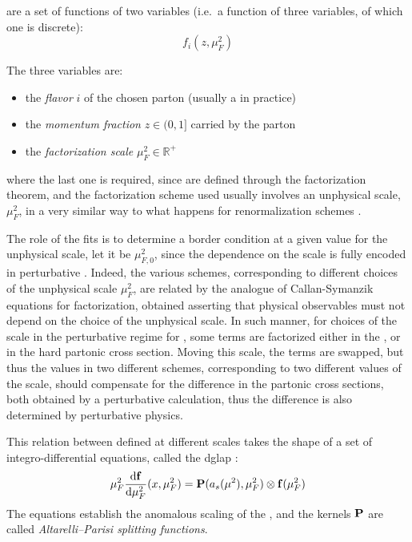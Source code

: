 
\pdfs are a set of functions of two variables (i.e.\ a function of three
variables, of which one is discrete):
\begin{equation}
  f_i(z, \mu_F^2)
  \label{eq:qcd/pdfs}
\end{equation}

The three variables are:
\begin{itemize}
  \item the \textit{flavor} $i$ of the chosen parton (usually a \pid in practice)
  \item the \textit{momentum fraction} $z \in (0,1]$ carried by the parton
  \item the \textit{factorization scale} $\mu_F^2 \in \mathbb{R}^+$
\end{itemize}
where the last one is required, since \pdfs are defined through the
factorization theorem, and the factorization scheme used usually involves an
unphysical scale, $\mu_F^2$, in a very similar way to what happens for
renormalization schemes \cite{Ellis:1996mzs}.

The role of the \pdf fits is to determine a border condition at a given value
for the unphysical scale, let it be $\mu_{F,0}^2$, since the dependence on the
scale is fully encoded in perturbative \qcd.
%
Indeed, the various schemes, corresponding to different choices of the
unphysical scale $\mu_F^2$, are related by the analogue of Callan-Symanzik
equations for factorization, obtained asserting that physical observables must
not depend on the choice of the unphysical scale.
%
In such manner, for choices of the scale in the perturbative regime for \qcd,
some terms are factorized either in the \pdf, or in the hard partonic cross
section.
Moving this scale, the terms are swapped, but thus the \pdf values in two
different schemes, corresponding to two different values of the scale, should
compensate for the difference in the partonic cross sections, both obtained by
a perturbative calculation, thus the difference is also determined by
perturbative physics.

This relation between \pdfs defined at different scales takes the shape of a
set of integro-differential equations, called the \acrfull{dglap}
\cite{Altarelli:1977zs,Gribov:1972ri,Dokshitzer:1977sg}:
\begin{equation}
	\muF^2 \dv{\vb f}{\muF^2}{}(x,\muF^2) = \vb P (a_s(\mu^2),\muF^2) \otimes \vb f(\muF^2)
	\label{eq:qcd/dglap}
\end{equation}
The equations establish the anomalous scaling of the \pdfs, and the kernels
${\vb P}$ are called \textit{Altarelli--Parisi splitting functions}.

